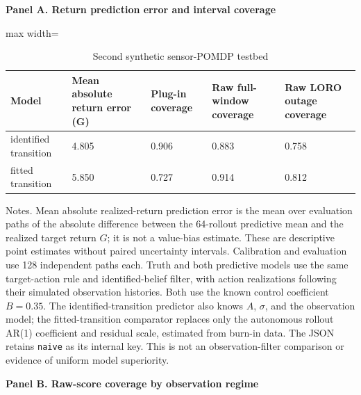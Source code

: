 \begin{table}[!ht]
\centering
\scriptsize
\caption{Second synthetic sensor-POMDP testbed}
\label{tab:13}
\vspace{0.5em}
\par\textbf{Panel A. Return prediction error and interval coverage}

\begin{adjustbox}{max width=\linewidth}
\begin{tabular}{@{}lllll@{}}
\toprule
Model & Mean absolute return error (G) & Plug-in coverage & Raw full-window coverage & Raw LORO outage coverage \\
\midrule
identified transition & 4.805 & 0.906 & 0.883 & 0.758 \\
fitted transition & 5.850 & 0.727 & 0.914 & 0.812 \\
\bottomrule
\end{tabular}
\end{adjustbox}
\vspace{0.5em}
\par\noindent\begin{minipage}{\linewidth}\raggedright{\scriptsize Notes. Mean absolute realized-return prediction error is the mean over evaluation paths of the absolute difference between the 64-rollout predictive mean and the realized target return $G$; it is not a value-bias estimate. These are descriptive point estimates without paired uncertainty intervals. Calibration and evaluation use 128 independent paths each. Truth and both predictive models use the same target-action rule and identified-belief filter, with action realizations following their simulated observation histories. Both use the known control coefficient $B=0.35$. The identified-transition predictor also knows $A$, $\sigma$, and the observation model; the fitted-transition comparator replaces only the autonomous rollout AR(1) coefficient and residual scale, estimated from burn-in data. The JSON retains \texttt{naive} as its internal key. This is not an observation-filter comparison or evidence of uniform model superiority.}\end{minipage}\par

\par\textbf{Panel B. Raw-score coverage by observation regime}


\end{table}
